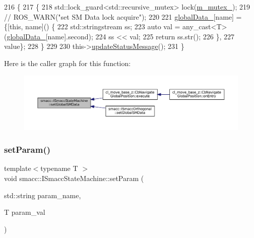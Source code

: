 \begin{DoxyCode}
216   \{
217     \{
218       std::lock\_guard<std::recursive\_mutex> lock(\hyperlink{classsmacc_1_1ISmaccStateMachine_aac785541646e5c517273bf31072505a1}{m\_mutex\_});
219       \textcolor{comment}{// ROS\_WARN("set SM Data lock acquire");}
220 
221       \hyperlink{classsmacc_1_1ISmaccStateMachine_ad2f9dae184ea942db632ac4532a10a91}{globalData\_}[name] = \{[\textcolor{keyword}{this}, name]() \{
222                              std::stringstream ss;
223                              \textcolor{keyword}{auto} val = any\_cast<T>(\hyperlink{classsmacc_1_1ISmaccStateMachine_ad2f9dae184ea942db632ac4532a10a91}{globalData\_}[name].second);
224                              ss << val;
225                              \textcolor{keywordflow}{return} ss.str();
226                            \},
227                            value\};
228     \}
229 
230     this->\hyperlink{classsmacc_1_1ISmaccStateMachine_ad246a49015fadaeb0b1639d7ab99f7d0}{updateStatusMessage}();
231   \}
\end{DoxyCode}
Here is the caller graph for this function\+:
\nopagebreak
\begin{figure}[H]
\begin{center}
\leavevmode
\includegraphics[width=350pt]{classsmacc_1_1ISmaccStateMachine_a8588f9e580fbb95b53e2bd2ca3ff1f98_icgraph}
\end{center}
\end{figure}
\mbox{\label{classsmacc_1_1ISmaccStateMachine_afc730437f45fa107292c078dfab2aa37}} 
\subsubsection{\texorpdfstring{set\+Param()}{setParam()}}
{\footnotesize\ttfamily template$<$typename T $>$ \\
void smacc\+::\+I\+Smacc\+State\+Machine\+::set\+Param (\begin{DoxyParamCaption}\item[{std\+::string}]{param\+\_\+name,  }\item[{T}]{param\+\_\+val }\end{DoxyParamCaption})\hspace{0.3cm}{\ttfamily [protected]}}



